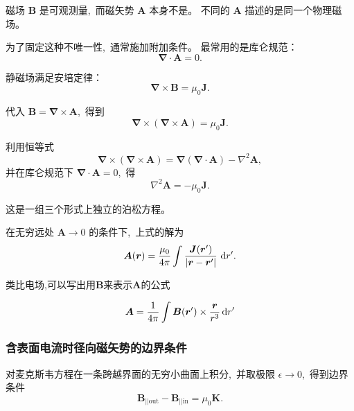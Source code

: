 磁场 $\boldsymbol{B}$ 是可观测量, \,而磁矢势 $\boldsymbol{A}$ 本身不是。
不同的 $\boldsymbol{A}$ 描述的是同一个物理磁场。


为了固定这种不唯一性, \,通常施加附加条件。
最常用的是{库仑规范}：
\begin{equation}
{
\boldsymbol{\nabla}\cdot\boldsymbol{A}=0.
}
\end{equation}


静磁场满足安培定律：
\begin{equation}
\boldsymbol{\nabla}\times\boldsymbol{B}=\mu_0\boldsymbol{J}.
\end{equation}

代入 $\boldsymbol{B}=\boldsymbol{\nabla}\times\boldsymbol{A}$, \,得到
\begin{equation}
\boldsymbol{\nabla}\times(\boldsymbol{\nabla}\times\boldsymbol{A})
=
\mu_0\boldsymbol{J}.
\end{equation}

利用恒等式
\[
\boldsymbol{\nabla}\times(\boldsymbol{\nabla}\times\boldsymbol{A})
=
\boldsymbol{\nabla}(\boldsymbol{\nabla}\cdot\boldsymbol{A})
-
\nabla^2\boldsymbol{A},
\]
并在库仑规范下 $\boldsymbol{\nabla}\cdot\boldsymbol{A}=0$, \,得
\begin{equation}
{
\nabla^2\boldsymbol{A}=-\mu_0\boldsymbol{J}.
}
\end{equation}

这是一组三个{形式上独立的泊松方程}。


在无穷远处 $\boldsymbol{A}\to0$ 的条件下, \,上式的解为
\begin{equation}
{
\boldsymbol{A}(\boldsymbol{r})
=
\frac{\mu_0}{4\pi}
\int
\frac{\boldsymbol{J}(\boldsymbol{r}')}{|\boldsymbol{r}-\boldsymbol{r}'|}
\,\dif r'.
}
\end{equation}

类比电场,可以写出用$\boldsymbol{B}$来表示$\boldsymbol{A}$的公式

\begin{equation}
    \boldsymbol{A}=\frac{1}{4\pi}\int\boldsymbol{B}(\boldsymbol r')\times\frac{\boldsymbol{r}}{r^3}\dif r'
\end{equation}

\subsubsection{含表面电流时径向磁矢势的边界条件}
对麦克斯韦方程在一条跨越界面的无穷小曲面上积分, \,并取极限 $\epsilon\to0$, \,得到边界条件
\begin{equation}
\boldsymbol{B}_{||\text{out}}-\boldsymbol{B}_{||\text{in}}=\mu_0\boldsymbol{K}.
\end{equation}

